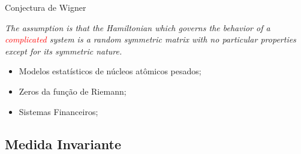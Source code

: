\begin{frame}
	\begin{history}{Conjectura de Wigner}
		\parbox{\linewidth}{\textit{The assumption is that
			the Hamiltonian which governs the behavior of
			a \textcolor{red}{complicated} system is a random symmetric
			matrix with no particular properties except for
			its symmetric nature.}}
	\end{history}

	\vspace{1cm}

	\pause
	\begin{itemize}
		\item Modelos estatísticos de núcleos atômicos pesados;
		\item Zeros da função de Riemann;
		\item Sistemas Financeiros;
	\end{itemize}
	
	
\end{frame}


\subsection{Medida Invariante}

